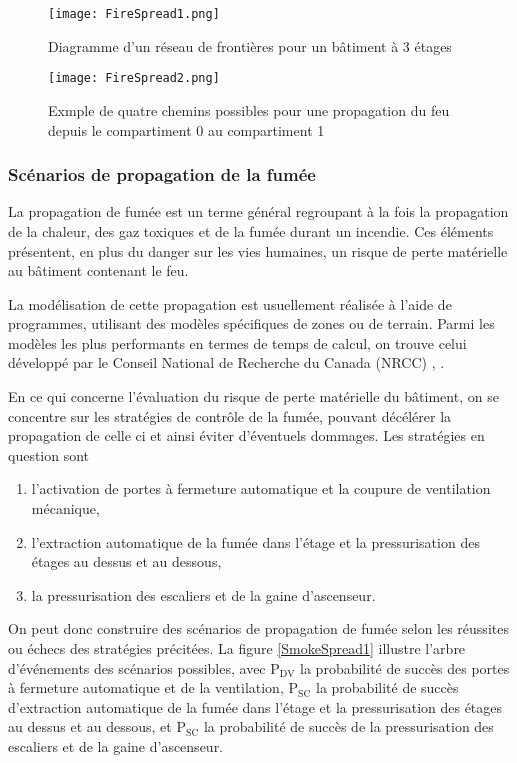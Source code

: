 \documentclass[11pt]{article}
\begin{document}
\begin{figure}
\begin{center}
\texttt{[image: FireSpread1.png]}
\end{center}
\caption{Diagramme d'un réseau de frontières pour un bâtiment à 3 étages}\label{FireSpread1}
\end{figure}

\begin{figure}
\begin{center}
\texttt{[image: FireSpread2.png]}
\end{center}
\caption{Exmple de quatre chemins possibles pour une propagation du feu depuis le compartiment 0 au compartiment 1}
\label{FireSpread2}
\end{figure}

\subsubsection{Scénarios de propagation de la fumée}

La propagation de fumée est un terme général regroupant à la fois la propagation de la chaleur, des gaz toxiques et de la fumée durant un incendie. Ces éléments présentent, en plus du danger sur les vies humaines, un risque de perte matérielle au bâtiment contenant le feu.

La modélisation de cette propagation est usuellement réalisée à l'aide de programmes, utilisant des modèles spécifiques de zones ou de terrain. Parmi les modèles les plus performants en termes de temps de calcul, on trouve celui développé par le Conseil National de Recherche du Canada (NRCC) \cite{hadjisophocleous1992model}, \cite{hokugo1994experiments}.

En ce qui concerne l'évaluation du risque de perte matérielle du bâtiment, on se concentre sur les stratégies de contrôle de la fumée, pouvant décélérer la propagation de celle ci et ainsi éviter d'éventuels dommages. Les stratégies en question sont
\begin{enumerate}
\item l'activation de portes à fermeture automatique et la coupure de ventilation mécanique,
\item l'extraction automatique de la fumée dans l'étage et la pressurisation des étages au dessus et au dessous,
\item la pressurisation des escaliers et de la gaine d'ascenseur.
\end{enumerate}

On peut donc construire des scénarios de propagation de fumée selon les réussites ou échecs des stratégies précitées. La figure \ref{SmokeSpread1} illustre l'arbre d'événements des scénarios possibles, avec $\text{P}_{\text{DV}}$ la probabilité de succès des portes à fermeture automatique et de la ventilation, $\text{P}_{\text{SC}}$ la probabilité de succès d'extraction automatique de la fumée dans l'étage et la pressurisation des étages au dessus et au dessous, et $\text{P}_{\text{SC}}$ la probabilité de succès de la pressurisation des escaliers et de la gaine d'ascenseur.
\end{document}
